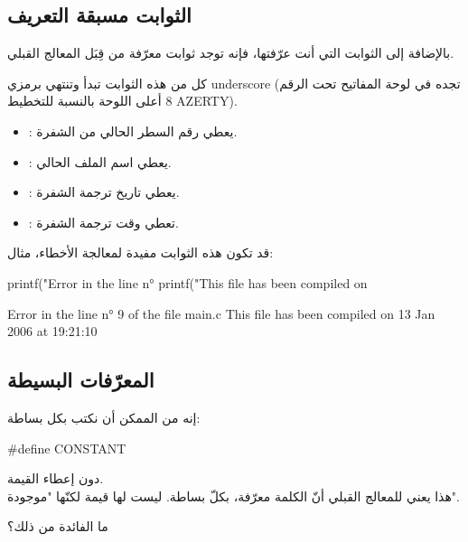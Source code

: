 \subsection{الثوابت مسبقة التعريف}

بالإضافة إلى الثوابت التي أنت عرّفتها، فإنه توجد ثوابت معرّفة من قِبَل المعالج القبلي.

كل من هذه الثوابت تبدأ وتنتهي برمزي
\textenglish{underscore} \InlineCode{\_}
(تجده في لوحة المفاتيح تحت الرقم 8 أعلى اللوحة بالنسبة للتخطيط
\textenglish{AZERTY}).

\begin{itemize}
  \item {}: يعطي رقم السطر الحالي من الشفرة.
  \item {}: يعطي اسم الملف الحالي.
  \item {}: يعطي تاريخ ترجمة الشفرة.
  \item {}: تعطي وقت ترجمة الشفرة.
\end{itemize}

قد تكون هذه الثوابت مفيدة لمعالجة الأخطاء، مثال:

\begin{Csource}
printf("Error in the line n° %
printf("This file has been compiled on %
\end{Csource}

\begin{Console}
Error in the line n° 9 of the file main.c
This file has been compiled on 13 Jan 2006 at 19:21:10
\end{Console}

\subsection{المعرّفات البسيطة}

إنه من الممكن أن نكتب بكل بساطة:

\begin{Csource}
#define CONSTANT
\end{Csource}

دون إعطاء القيمة.\\
هذا يعني للمعالج القبلي أنّ الكلمة
معرّفة، بكلّ بساطة. ليست لها قيمة لكنّها "موجودة".

\begin{question}
  ما الفائدة من ذلك؟
\end{question}

